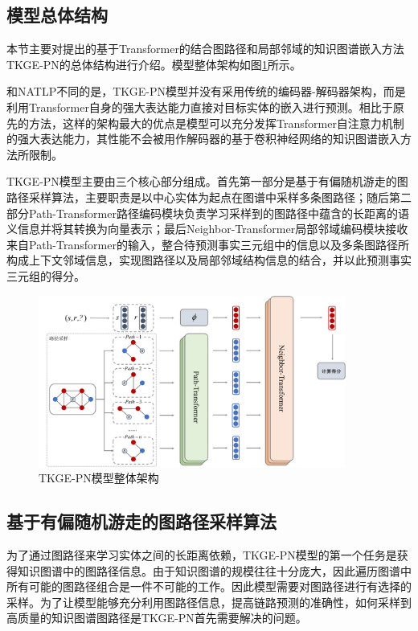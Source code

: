 \subsection{模型总体结构}

本节主要对提出的基于Transformer的结合图路径和局部邻域的知识图谱嵌入方法TKGE-PN的总体结构进行介绍。模型整体架构如图\ref{TKGE-PN_architecture}所示。

和NATLP不同的是，TKGE-PN模型并没有采用传统的编码器-解码器架构，而是利用Transformer自身的强大表达能力直接对目标实体的嵌入进行预测。相比于原先的方法，这样的架构最大的优点是模型可以充分发挥Transformer自注意力机制的强大表达能力，其性能不会被用作解码器的基于卷积神经网络的知识图谱嵌入方法所限制。

TKGE-PN模型主要由三个核心部分组成。首先第一部分是基于有偏随机游走的图路径采样算法，主要职责是以中心实体为起点在图谱中采样多条图路径；随后第二部分Path-Transformer路径编码模块负责学习采样到的图路径中蕴含的长距离的语义信息并将其转换为向量表示；最后Neighbor-Transformer局部邻域编码模块接收来自Path-Transformer的输入，整合待预测事实三元组中的信息以及多条图路径所构成上下文邻域信息，实现图路径以及局部邻域结构信息的结合，并以此预测事实三元组的得分。

\begin{figure}[htbp]
  \centerline{\includegraphics[width=0.9\textwidth]{pic/TKGE-PN.pdf}}
  \caption{TKGE-PN模型整体架构}
  \label{TKGE-PN_architecture}
\end{figure}

\subsection{基于有偏随机游走的图路径采样算法}

为了通过图路径来学习实体之间的长距离依赖，TKGE-PN模型的第一个任务是获得知识图谱中的图路径信息。由于知识图谱的规模往往十分庞大，因此遍历图谱中所有可能的图路径组合是一件不可能的工作。因此模型需要对图路径进行有选择的采样。为了让模型能够充分利用图路径信息，提高链路预测的准确性，如何采样到高质量的知识图谱图路径是TKGE-PN首先需要解决的问题。

